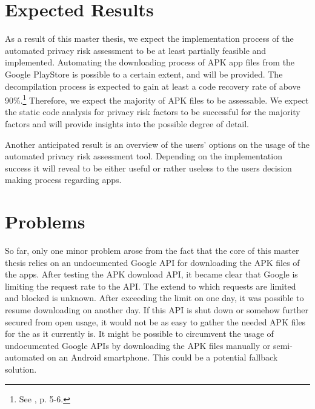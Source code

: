 \documentclass[
	a4paper,
	oneside,
	12pt,
	liststotocnumbered
]{article}
\let\cite\textcite
\begin{document}
\section{Expected Results}

As a result of this master thesis, we expect the implementation process of the automated privacy risk assessment to be at least partially feasible and implemented. 
Automating the downloading process of \acs{APK} app files from the Google PlayStore is possible to a certain extent, and will be provided.
The decompilation process is expected to gain at least a code recovery rate of above 90\%.\footnote{See \cite{Enck2011}, p. 5-6.} 
Therefore, we expect the majority of \acs{APK} files to be assessable.
We expect the static code analysis for privacy risk factors to be successful for the majority factors and will provide insights into the possible degree of detail.

Another anticipated result is an overview of the users' options on the usage of the automated privacy risk assessment tool. 
Depending on the implementation success it will reveal to be either useful or rather useless to the users decision making process regarding \mH apps.

\section{Problems}
So far, only one minor problem arose from the fact that the core of this master thesis relies on an undocumented Google \acs{API} for downloading the \acs{APK} files of the apps. 
After testing the \acs{APK} download \acs{API}, it became clear that Google is limiting the request rate to the API. 
The extend to which requests are limited and blocked is unknown.
After exceeding the limit on one day, it was possible to resume downloading on another day.
If this \acs{API} is shut down or somehow further secured from open usage, it would not be as easy to gather the needed \acs{APK} files for the \sca as it currently is.
It might be possible to circumvent the usage of undocumented Google \acs{API}s by downloading the \acs{APK} files manually or semi-automated on an Android smartphone. 
This could be a potential fallback solution.

\newpage
\printbibliography[title={References}]
\end{document}
